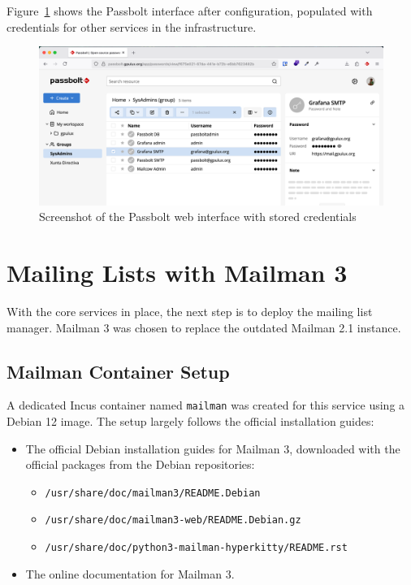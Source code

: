 Figure~\ref{fig:passbolt-gpulux} shows the Passbolt interface after configuration, populated with credentials for other services in the infrastructure.

\begin{figure}[H]
	\centering
	\includegraphics[width=\textwidth]{imaxes/passbolt-gpulux.png}
       \caption{Screenshot of the Passbolt web interface with stored credentials}
	\label{fig:passbolt-gpulux}
\end{figure}

\section{Mailing Lists with Mailman 3}

With the core services in place, the next step is to deploy the mailing list manager. Mailman 3 was chosen to replace the outdated Mailman 2.1 instance.

\subsection*{Mailman Container Setup}

A dedicated Incus container named \texttt{mailman} was created for this service using a Debian 12 image. The setup largely follows the official installation guides:
\begin{itemize}
    \item The official Debian installation guides for Mailman 3, downloaded with the official packages from the Debian repositories:
    \begin{itemize}
        \item \texttt{/usr/share/doc/mailman3/README.Debian}
        \item \texttt{/usr/share/doc/mailman3-web/README.Debian.gz}
        \item \texttt{/usr/share/doc/python3-mailman-hyperkitty/README.rst}
    \end{itemize}
    \item The online documentation for Mailman 3\cite{mailman3-docs}.
\end{itemize}

